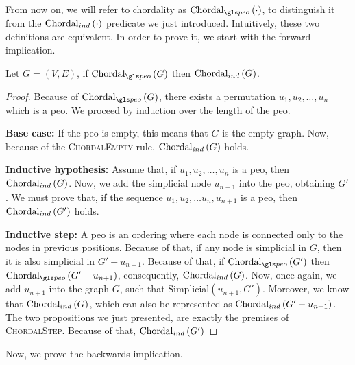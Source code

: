 From now on, we will refer to chordality as  $\chordalpeo{\cdot}$, to distinguish it from the $\mathrm{Chordal}_{ind}\left({\cdot}\right)$ predicate we just introduced. Intuitively, these two definitions are equivalent. In order to prove it, we start with the forward implication.

\begin{lemma}\label{lem:chordal12}
    Let $G = (V, E)$, if $\chordalpeo{G}$ then $\mathrm{Chordal}_{ind}\left({G}\right)$.
\end{lemma}

\begin{proof}
    Because of $\chordalpeo{G}$, there exists a permutation $u_1, u_2, \dots, u_n$ which is a \gls{peo}. We proceed by induction over the length of the \gls{peo}.

    \medskip

    \textbf{Base case:}
    If the \gls{peo} is empty, this means that $G$ is the empty graph. Now, because of the \textsc{ChordalEmpty} rule, $\mathrm{Chordal}_{ind}\left({G}\right)$ holds.

    \medskip

    \textbf{Inductive hypothesis:}
    Assume that, if $u_1, u_2, \dots, u_n$ is a \gls{peo}, then $\mathrm{Chordal}_{ind}\left({G}\right)$. Now, we add the simplicial node $u_{n+1}$ into the \gls{peo}, obtaining $G'$. We must prove that, if the sequence $u_1, u_2, \dots u_n, u_{n+1}$ is a \gls{peo}, then $\mathrm{Chordal}_{ind}\left({G'}\right)$ holds.

    \medskip

    \textbf{Inductive step:}
    A \gls{peo} is an ordering where each node is connected only to the nodes in previous positions. Because of that, if any node is simplicial in $G$, then it is also simplicial in $G' - u_{n+1}$. Because of that, if $\chordalpeo{G'}$ then $\chordalpeo{G' - u_{n+1}}$, consequently, $\mathrm{Chordal}_{ind}\left({G}\right)$. Now, once again, we add $u_{n+1}$ into the graph $G$, such that Simplicial$(u_{n+1}, G')$. Moreover, we know that $\mathrm{Chordal}_{ind}\left({G}\right)$, which can also be represented as $\mathrm{Chordal}_{ind}\left({G' - u_{n+1}}\right)$. The two propositions we just presented, are exactly the premises of \textsc{ChordalStep}. Because of that, $\mathrm{Chordal}_{ind}\left({G'}\right)$
\end{proof}

Now, we prove the backwards implication.

